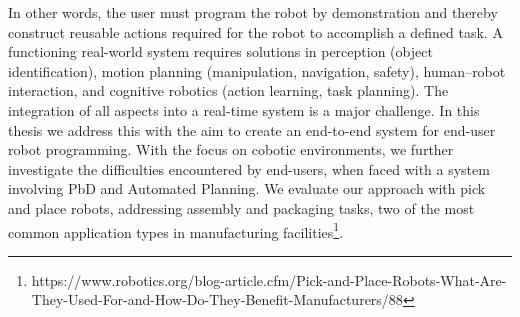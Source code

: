 In other words, the user must program the robot by demonstration and thereby construct 
reusable actions required for the robot to accomplish a defined task.
A functioning real-world system requires solutions in perception (\eg object identification), motion planning (\eg manipulation, navigation, safety), human–robot interaction, and cognitive robotics (\eg action learning, task planning). 
The integration of all aspects into a real-time system is a major challenge.
In this thesis we address this with the aim to create an end-to-end system for end-user robot programming.
With the focus on cobotic environments, we further investigate the difficulties encountered by end-users, when faced with a system involving PbD and Automated Planning. 
We evaluate our approach with pick and place robots, addressing assembly and packaging tasks, two of the most common application types in manufacturing facilities\footnote{https://www.robotics.org/blog-article.cfm/Pick-and-Place-Robots-What-Are-They-Used-For-and-How-Do-They-Benefit-Manufacturers/88}.

%


